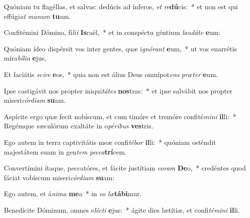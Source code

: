 \item Quóniam tu flagéllas, et salvas: dedúcis ad ínferos, \textit{et} \textit{re}\textbf{dú}cis:~* et non est qui effúgi\textit{at} \textit{ma}\textit{num} \textbf{tu}am.
\item Confitémini Dómino, fí\textit{li}\textit{i} \textbf{Is}raël,~* et in conspéctu géntium \textit{lau}\textit{dá}\textit{te} \textbf{e}um:
\item Quóniam ídeo dispérsit vos inter gentes, quæ i\textit{gnó}\textit{rant} \textbf{e}um,~* ut vos enarrétis mira\textit{bí}\textit{li}\textit{a} \textbf{e}jus,
\item Et faciátis \textit{sci}\textit{re} \textbf{e}os,~* quia non est álius Deus omnípot\textit{ens} \textit{præ}\textit{ter} \textbf{e}um.
\item Ipse castigávit nos propter iniqui\textit{tá}\textit{tes} \textbf{nos}tras:~* et ipse salvábit nos propter miseri\textit{cór}\textit{di}\textit{am} \textbf{su}am.
\item Aspícite ergo quæ fecit nobíscum, et cum timóre et tremóre confité\textit{mi}\textit{ni} \textbf{il}li:~* Regémque sæculórum exaltáte in o\textit{pé}\textit{ri}\textit{bus} \textbf{ves}tris.
\item Ego autem in terra captivitátis meæ confi\textit{té}\textit{bor} \textbf{il}li:~* quóniam osténdit majestátem suam in gen\textit{tem} \textit{pec}\textit{ca}\textbf{trí}cem.
\item Convertímini ítaque, peccatóres, et fácite justítiam \textit{co}\textit{ram} \textbf{De}o,~* credéntes quod fáciat vobíscum miseri\textit{cór}\textit{di}\textit{am} \textbf{su}am:
\item Ego autem, et á\textit{ni}\textit{ma} \textbf{me}a~* in \textit{e}\textit{o} \textit{læ}\textbf{tá}\textbf{bi}mur.
\item Benedícite Dóminum, omnes e\textit{léc}\textit{ti} \textbf{e}jus:~* ágite dies lætítiæ, et confi\textit{té}\textit{mi}\textit{ni} \textbf{il}li.
